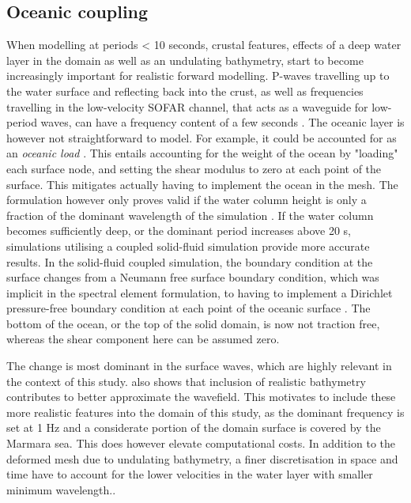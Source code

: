 \documentclass[../Text/00main.tex]{subfiles}
\begin{document}
\subsection{Oceanic coupling}

When modelling at periods < 10 seconds, crustal features, effects of a deep water layer in the domain as well as an undulating bathymetry, start to become increasingly important for realistic forward modelling. P-waves travelling up to the water surface and reflecting back into the crust, as well as frequencies travelling in the low-velocity SOFAR channel, that acts as a waveguide for low-period waves, can have a frequency content of a few seconds \citep{fernando2020oceanic}. The oceanic layer is however not straightforward to model. For example, it could be accounted for as an \textit{oceanic load} \citep{komatitsch2002spectral}. This entails accounting for the weight of the ocean by "loading" each surface node, and setting the shear modulus to zero at each point of the surface. This mitigates actually having to implement the ocean in the mesh. The formulation however only proves valid if the water column height is only a fraction of the dominant wavelength of the simulation \citep{fernando2020oceanic}. If the water column becomes sufficiently deep, or the dominant period increases above 20 s, simulations utilising a coupled solid-fluid simulation provide more accurate results. In the solid-fluid coupled simulation, the boundary condition at the surface changes from a Neumann free surface boundary condition, which was implicit in the spectral element formulation, to having to implement a Dirichlet pressure-free boundary condition at each point of the oceanic surface \citep{zhou_location_2016}. The bottom of the ocean, or the  top of the solid domain, is now not traction free, whereas the shear component here can be assumed zero.



The change is most dominant in the surface waves, which are highly relevant in the context of this study.  \citet{fernando2020oceanic} also shows that inclusion of realistic bathymetry contributes to better approximate the wavefield. This motivates to include these more realistic features into the domain of this study, as the dominant frequency is set at 1 Hz and a considerate portion of the domain surface is covered by the Marmara sea. This does however elevate computational costs. In addition to the deformed mesh due to undulating bathymetry, a finer discretisation in space and time have to account for the lower velocities in the water layer with smaller minimum wavelength.. 
\end{document}
